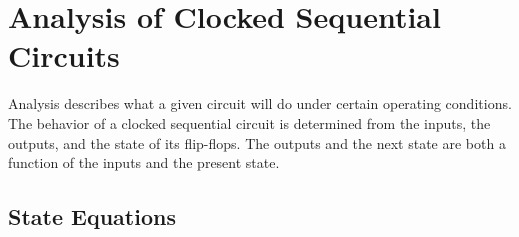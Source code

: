 \section{Analysis of Clocked Sequential Circuits}
\label{sec:analysis-clocked-seq-circ}

Analysis describes what a given circuit will do under certain operating conditions. The behavior of a clocked sequential circuit is determined from the inputs, the outputs, and the state of its flip-flops. The outputs and the next state are both a function of the inputs and the present state.

\subsection{State Equations}
\label{subsec:state-equations}

